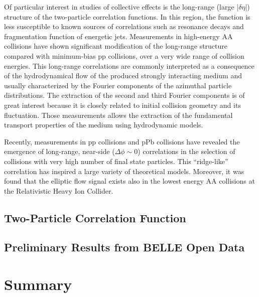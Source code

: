\documentclass[%
preprint,
 amsmath,amssymb,
 aps,
]{revtex4-1}
\begin{document}
Of particular interest in studies of collective effects is the long-range (large |$\delta\eta$|) structure of the two-particle correlation functions. In this region, the function is less susceptible to known sources of correlations such as resonance decays and fragmentation function of energetic jets. Measurements in high-energy AA collisions have shown significant modification of the long-range structure compared with minimum-bias pp collisions, over a very wide range of collision energies. This long-range correlations are commonly interpreted as a consequence of the hydrodynamical flow of the produced strongly interacting medium and usually characterized by the Fourier components of the azimuthal particle distributions. The extraction of the second and third Fourier components is of great interest because it is closely related to initial collision geometry and its fluctuation. Those measurements allows the extraction of the fundamental transport properties of the medium using hydrodynamic models.

Recently, measurements in pp collisions and pPb collisions have revealed the emergence of long-range, near-side ($\Delta\phi\sim 0$) correlations in the selection of collisions with very high number of final state particles. This ``ridge-like'' correlation has inspired a large variety of theoretical models. Moreover, it was found that the elliptic flow signal exists also in the lowest energy AA collisions at the Relativistic Heavy Ion Collider. 

\subsection{Two-Particle Correlation Function}

\subsection{Preliminary Results from BELLE Open Data}

\section{Summary}
\end{document}
